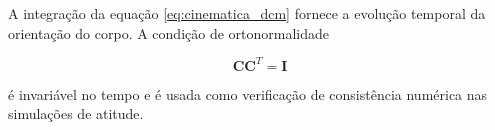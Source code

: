 A integração da equação \eqref{eq:cinematica_dcm} fornece a evolução temporal da orientação do corpo.  
A condição de ortonormalidade

\begin{equation}
\mathbf{C}\mathbf{C}^T = \mathbf{I}
\end{equation}

é invariável no tempo e é usada como verificação de consistência numérica nas simulações de atitude.